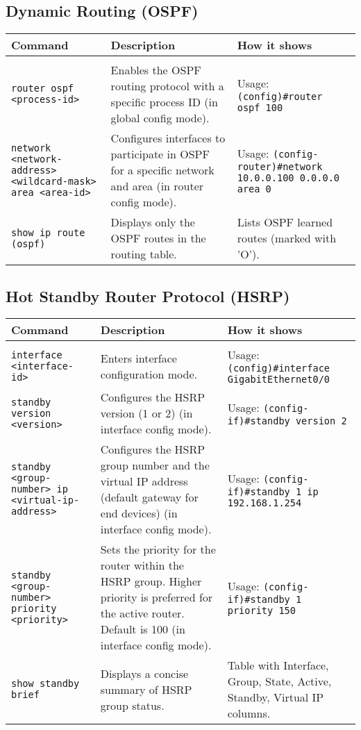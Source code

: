 \documentclass{article}
\begin{document}
\subsection{Dynamic Routing (OSPF)}
\begin{longtable}{>{\raggedright\arraybackslash}p{4cm}|>{\raggedright\arraybackslash}p{7cm}|>{\raggedright\arraybackslash}p{5cm}}
\toprule
\textbf{Command} & \textbf{Description} & \textbf{How it shows} \\
\midrule
\endhead
\midrule
\multicolumn{3}{r}{{Continued on next page}} \\
\midrule
\endfoot
\bottomrule
\endlastfoot
\texttt{router ospf <process-id>} & Enables the OSPF routing protocol with a specific process ID (in global config mode). & Usage: \texttt{(config)\#router ospf 100} \\
\hline
\texttt{network <network-address> <wildcard-mask> area <area-id>} & Configures interfaces to participate in OSPF for a specific network and area (in router config mode). & Usage: \texttt{(config-router)\#network 10.0.0.100 0.0.0.0 area 0} \\
\hline
\texttt{show ip route (ospf)} & Displays only the OSPF routes in the routing table. & Lists OSPF learned routes (marked with 'O'). \\
\end{longtable}

\subsection{Hot Standby Router Protocol (HSRP)}
\begin{longtable}{>{\raggedright\arraybackslash}p{4cm}|>{\raggedright\arraybackslash}p{7cm}|>{\raggedright\arraybackslash}p{5cm}}
\toprule
\textbf{Command} & \textbf{Description} & \textbf{How it shows} \\
\midrule
\endhead
\midrule
\multicolumn{3}{r}{{Continued on next page}} \\
\midrule
\endfoot
\bottomrule
\endlastfoot
\texttt{interface <interface-id>} & Enters interface configuration mode. & Usage: \texttt{(config)\#interface GigabitEthernet0/0} \\
\hline
\texttt{standby version <version>} & Configures the HSRP version (1 or 2) (in interface config mode). & Usage: \texttt{(config-if)\#standby version 2} \\
\hline
\texttt{standby <group-number> ip <virtual-ip-address>} & Configures the HSRP group number and the virtual IP address (default gateway for end devices) (in interface config mode). & Usage: \texttt{(config-if)\#standby 1 ip 192.168.1.254} \\
\hline
\texttt{standby <group-number> priority <priority>} & Sets the priority for the router within the HSRP group. Higher priority is preferred for the active router. Default is 100 (in interface config mode). & Usage: \texttt{(config-if)\#standby 1 priority 150} \\
\hline
\texttt{show standby brief} & Displays a concise summary of HSRP group status. & Table with Interface, Group, State, Active, Standby, Virtual IP columns. \\
\end{longtable}
\end{document}
